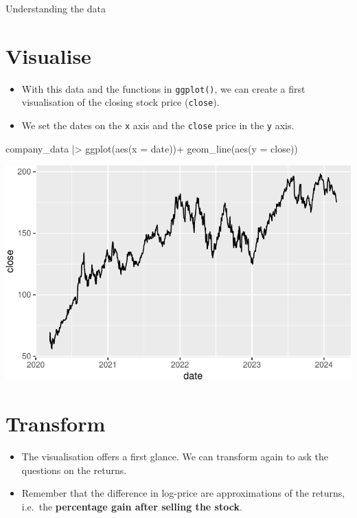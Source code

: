 \documentclass[
  12pt]{article}
\newenvironment{Shaded}{\begin{snugshade}}{\end{snugshade}}
\newcommand{\AttributeTok}[1]{\textcolor[rgb]{0.40,0.45,0.13}{#1}}
\newcommand{\FunctionTok}[1]{\textcolor[rgb]{0.28,0.35,0.67}{#1}}
\newcommand{\NormalTok}[1]{\textcolor[rgb]{0.00,0.23,0.31}{#1}}
\newcommand{\SpecialCharTok}[1]{\textcolor[rgb]{0.37,0.37,0.37}{#1}}
\theoremstyle{definition}
\theoremstyle{remark}
\begin{document}
Understanding the data

\section{Visualise}\label{visualise}

\begin{itemize}
\item
  With this data and the functions in \texttt{ggplot()}, we can create a
  first visualisation of the closing stock price (\texttt{close}).
\item
  We set the dates on the \texttt{x} axis and the \texttt{close} price
  in the \texttt{y} axis.
\end{itemize}

\begin{Shaded}
\begin{Highlighting}[]
\NormalTok{company\_data }\SpecialCharTok{|\textgreater{}} 
  \FunctionTok{ggplot}\NormalTok{(}\FunctionTok{aes}\NormalTok{(}\AttributeTok{x =}\NormalTok{ date))}\SpecialCharTok{+}
  \FunctionTok{geom\_line}\NormalTok{(}\FunctionTok{aes}\NormalTok{(}\AttributeTok{y =}\NormalTok{ close)) }
\end{Highlighting}
\end{Shaded}

\includegraphics{jasa_files/figure-pdf/unnamed-chunk-6-1.pdf}

\section{Transform}\label{transform}

\begin{itemize}
\item
  The visualisation offers a first glance. We can transform again to ask
  the questions on the returns.
\item
  Remember that the difference in log-price are approximations of the
  returns, i.e.~the \textbf{percentage gain after selling the stock}.
\end{itemize}
\end{document}
